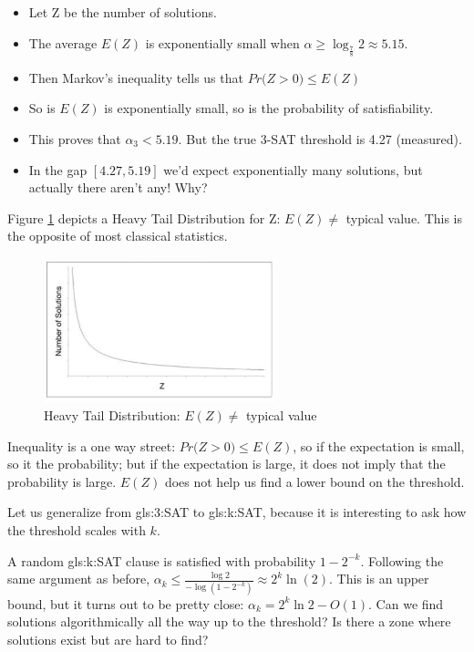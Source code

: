 \documentclass[]{article}
\begin{document}
\begin{itemize}
	\item Let Z be the number of solutions.
	\item The average $E(Z)$ is exponentially small when  $\alpha \ge \log_{\frac{7}{8}}2\approx5.15$.
	\item Then Markov's inequality\cite{wiki:markov:inequality} tells us that $Pr\big(Z>0\big) \le E(Z)$ 
	\item So is $E(Z)$ is exponentially small, so is the probability of satisfiability.
	\item This proves that $\alpha_3<5.19$. But the true 3-SAT threshold is 4.27 (measured).
	\item In the gap $[4.27,5.19]$ we'd expect exponentially many solutions, but actually there aren't any! Why?
\end{itemize}

Figure \ref{fig:heavy-tail} depicts a Heavy Tail Distribution for Z: $E(Z)\ne$ typical value. This is the opposite of most classical statistics.
\begin{figure}[H]
	\begin{center}
		\caption{Heavy Tail Distribution: $E(Z)\ne$ typical value}\label{fig:heavy-tail}
		\includegraphics[width=0.6\textwidth]{heavy-tail}
	\end{center}
\end{figure}

Inequality is a one way street: $Pr\big(Z>0\big) \le E(Z)$, so if the expectation is small, so it the probability; but if the expectation is large, it does not imply that the probability is large. $E(Z)$ does not help us find a lower bound on the threshold.

Let us generalize from \gls{gls:3:SAT} to \gls{gls:k:SAT}, because it is interesting to ask how the threshold scales with $k$.

A random \gls{gls:k:SAT} clause is satisfied with probability $1-2^{-k}$. Following the same argument as before, $\alpha_k\le\frac{\log 2}{-\log (1-2^{-k})} \approx 2^k \ln(2)$. This is an upper bound, but it turns out to be pretty close: $\alpha_k=2^k \ln 2-O(1)$. Can we find solutions algorithmically all the way up to the threshold? Is there a zone where solutions exist but are hard to find?
\end{document}
